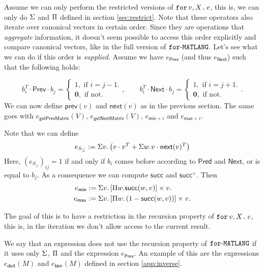 Assume we can only perform the restricted versions of $\texttt{for}\, v,X \texttt{.}\, e$, this is, we can only do 
$\Sigma$ and $\Pi$ defined in section \ref{sec:restrict}. Note that these operators also iterate over canonical vectors
in certain order. Since they are operations that \textit{aggregate} information, it doesn't seem
possible to access this order explicitly and compare canonical vectors, like in the full version of $\texttt{for}\text{-}\texttt{MATLANG}$.
Let's see what we can do if this order is \textit{supplied}. Assume we have $e_{\mathsf{Prev}}$ 
(and thus $e_{\mathsf{Next}}$) such that the following holds:

$$
b_i^T\cdot \mathsf{Prev} \cdot b_j=\begin{cases}
               1, \text{ if } i = j-1.\\
              \mathbf{0}, \text{ if not.}
            \end{cases},
\hspace{2em}b_i^T\cdot \mathsf{Next} \cdot b_j=\begin{cases}
               1, \text{ if } i=j+1.\\
              \mathbf{0}, \text{ if not.}
            \end{cases}.
$$
We can now define $\mathsf{prev}(v)$ and $\mathsf{next}(v)$ as in the previous section. 
The same goes with $e_{\mathsf{getPrevMatrix}}(V)$, 
$e_{\mathsf{getNextMatrix}}(V)$, $e_{\mathsf{min}+i}$ and $e_{\mathsf{max}+i}$.

Note that we can define
$$
e_{S_{\leq}}:=\Sigma v. \left( v\cdot v^T + \Sigma w. v\cdot\mathsf{next}(v)^T \right)
$$
Here, $(e_{S_{\leq}})_{ij}=1$ if and only if $b_i$ comes 
before according to $\mathsf{Pred}$ and $\mathsf{Next}$, or is equal to $b_j$. As a consequence we
can compute $\mathsf{succ}$ and $\mathsf{succ}^+$. Then
\begin{align*}
  e_{\mathsf{min}}&:=\Sigma v. \left[ \Pi w. \mathsf{succ}(w,v)\right] \times v. \\
  e_{\mathsf{max}}&:=\Sigma v. \left[ \Pi w. \left( 1-\mathsf{succ}(w,v) \right) \right] \times v.
\end{align*}

The goal of this is to have a restriction in the recursion property of $\texttt{for}\, v,X \texttt{.}\, e$, this is, 
in the iteration we don't allow access to the current result.

We say that an expression does not use the recursion property of $\texttt{for}\text{-}\texttt{MATLANG}$ if it uses
only $\Sigma$, $\Pi$ and the expression $e_{\mathsf{Prev}}$.
An example of this are the expressions $e_{\mathbf{det}}(M)$ and $e_{\mathbf{inv}}(M)$ defined 
in section \ref{app:inverse}.

